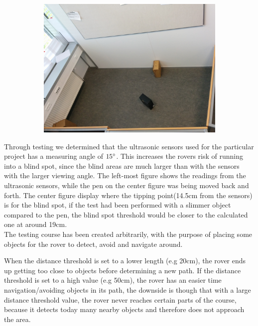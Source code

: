 \begin{figure}[H]
	\quad
	\begin{subfigure}[H]{0.3\textwidth}
		\includegraphics[width=\textwidth]{images/testing-course.jpg}
	\end{subfigure}
\end{figure}

Through testing we determined that the ultrasonic sensors used for the particular project has a measuring angle of $15\degree$. This increases the rovers risk of running into a blind spot, since the blind areas are much larger than with the sensors with the larger viewing angle. The left-most figure shows the readings from the ultrasonic sensors, while the pen on the center figure was being moved back and forth. The center figure display where the tipping point(14.5cm from the sensors) is for the blind spot, if the test had been performed with a slimmer object compared to the pen, the blind spot threshold would be closer to the calculated one at around 19cm.\\
The testing course has been created arbitrarily, with the purpose of placing some objects for the rover to detect, avoid and navigate around.


When the distance threshold is set to a lower length (e.g 20cm), the rover ends up getting too close to objects before determining a new path. If the distance threshold is set to a high value (e.g 50cm), the rover has an easier time navigation/avoiding objects in its path, the downside is though that with a large distance threshold value, the rover never reaches certain parts of the course, because it detects today many nearby objects and therefore does not approach the area.

